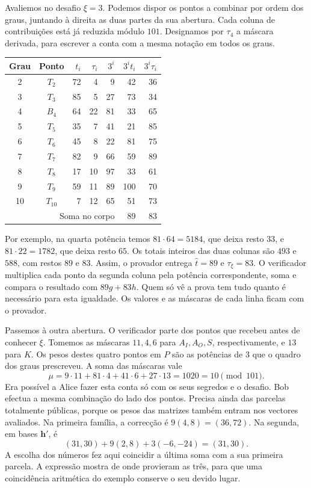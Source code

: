 Avaliemos no desafio \(\xi=3\). Podemos dispor os pontos a combinar
por ordem dos graus, juntando à direita as duas partes da sua abertura.
Cada coluna de contribuições está já reduzida módulo \(101\).
Designamos por \(\tau_4\) a máscara derivada, para escrever a conta
com a mesma notação em todos os graus.
\begin{center}
\begin{tabular}{c|c|rr|r|rr}
 Grau & Ponto & \(t_i\)&\(\tau_i\)&\(3^i\)&\(3^it_i\)&\(3^i\tau_i\)\\ \hline
 2&\(T_2\)&72&4&9&42&36\\
 3&\(T_3\)&85&5&27&73&34\\
 4&\(B_4\)&64&22&81&33&65\\
 5&\(T_5\)&35&7&41&21&85\\
 6&\(T_6\)&45&8&22&81&75\\
 7&\(T_7\)&82&9&66&59&89\\
 8&\(T_8\)&17&10&97&33&61\\
 9&\(T_9\)&59&11&89&100&70\\
10&\(T_{10}\)&7&12&65&51&73\\ \hline
 &\multicolumn{4}{r|}{Soma no corpo}&89&83
\end{tabular}
\end{center}
Por exemplo, na quarta potência temos \(81\cdot64=5184\), que
deixa resto \(33\), e \(81\cdot22=1782\), que deixa resto \(65\).
Os totais inteiros das duas colunas são \(493\) e \(588\), com
restos \(89\) e \(83\). Assim, o provador entrega \(\widehat t=89\)
e \(\tau_\xi=83\). O verificador multiplica cada ponto da segunda
coluna pela potência correspondente, soma e compara o resultado com
\(89g+83h\). Quem só vê a prova tem tudo quanto é necessário para
esta igualdade. Os valores e as máscaras de cada linha ficam com
o provador.

Passemos à outra abertura. O verificador parte dos pontos que
recebeu antes de conhecer \(\xi\). Tomemos as máscaras \(11,4,6\)
para \(A_I,A_O,S\), respectivamente, e \(13\) para \(K\).
Os pesos destes quatro pontos em \(P\) são as potências de \(3\)
que o quadro dos graus prescreveu. A soma das máscaras vale
\[
 \mu=9\cdot11+81\cdot4+41\cdot6+27\cdot13
    =1020=10\pmod{101}.
\]
Era possível a Alice fazer esta conta só com os seus segredos e o
desafio. Bob efectua a mesma combinação do lado dos pontos. Precisa
ainda das parcelas totalmente públicas, porque os pesos das matrizes
também entram nos vectores avaliados. Na primeira família, a
correcção é \(9(4,8)=(36,72)\). Na segunda, em bases
\(\boldsymbol h'\), é
\[
        (31,30)+9(2,8)+3(-6,-24)=(31,30).
\]
A escolha dos números fez aqui coincidir a última soma com a sua
primeira parcela. A expressão mostra de onde provieram as três,
para que uma coincidência aritmética do exemplo conserve o seu
devido lugar.

